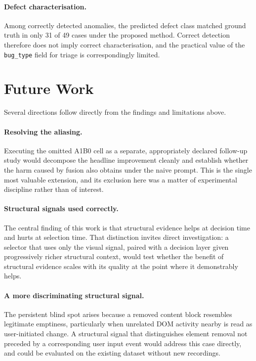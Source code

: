 \paragraph{Defect characterisation.}
Among correctly detected anomalies, the predicted defect class matched
ground truth in only 31 of 49 cases under the proposed method. Correct
detection therefore does not imply correct characterisation, and the
practical value of the \texttt{bug\_type} field for triage is
correspondingly limited.


\section{Future Work}
\label{sec:futurework}

Several directions follow directly from the findings and limitations
above.

\paragraph{Resolving the aliasing.}
Executing the omitted A1B0 cell as a separate, appropriately declared
follow-up study would decompose the headline improvement cleanly and
establish whether the harm caused by fusion also obtains under the naive
prompt. This is the single most valuable extension, and its exclusion here
was a matter of experimental discipline rather than of interest.

\paragraph{Structural signals used correctly.}
The central finding of this work is that structural evidence helps at
decision time and hurts at selection time. That distinction invites direct
investigation: a selector that uses only the visual signal, paired with a
decision layer given progressively richer structural context, would test
whether the benefit of structural evidence scales with its quality at the
point where it demonstrably helps.

\paragraph{A more discriminating structural signal.}
The persistent blind spot arises because a removed content block resembles
legitimate emptiness, particularly when unrelated DOM activity nearby is
read as user-initiated change. A structural signal that distinguishes
element removal not preceded by a corresponding user input event would
address this case directly, and could be evaluated on the existing dataset
without new recordings.

